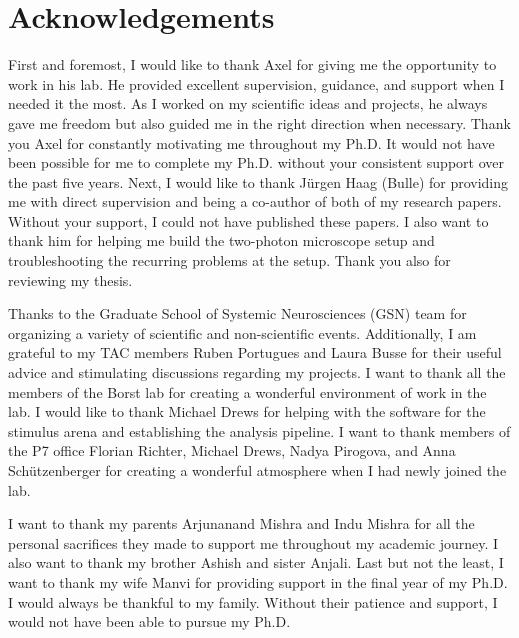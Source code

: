 
\begingroup
\let\clearpage\relax
\let\cleardoublepage\relax
\let\cleardoublepage\relax

\chapter*{Acknowledgements}

First and foremost, I would like to thank Axel for giving me the opportunity to work in his lab. He provided excellent supervision, guidance, and support when I needed it the most. As I worked on my scientific ideas and projects, he always gave me freedom but also guided me in the right direction when necessary. Thank you Axel for constantly motivating me throughout my Ph.D. It would not have been possible for me to complete my Ph.D. without your consistent support over the past five years. Next, I would like to thank Jürgen Haag (Bulle) for providing me with direct supervision and being a co-author of both of my research papers. Without your support, I could not have published these papers. I also want to thank him for helping me build the two-photon microscope setup and troubleshooting the recurring problems at the setup. Thank you also for reviewing my thesis. 

Thanks to the Graduate School of Systemic Neurosciences (GSN) team for organizing a variety of scientific and non-scientific events. Additionally, I am grateful to my TAC members Ruben Portugues and Laura Busse for their useful advice and stimulating discussions regarding my projects. I want to thank all the members of the Borst lab for creating a wonderful environment of work in the lab. I would like to thank Michael Drews for helping with the software for the stimulus arena and establishing the analysis pipeline. I want to thank members of the P7 office Florian Richter, Michael Drews, Nadya Pirogova, and Anna Schützenberger for creating a wonderful atmosphere when I had newly joined the lab. 

I want to thank my parents Arjunanand Mishra and Indu Mishra for all the personal sacrifices they made to support me throughout my academic journey. I also want to thank my brother Ashish and sister Anjali. Last but not the least, I want to thank my wife Manvi for providing support in the final year of my Ph.D. I would always be thankful to my family. Without their patience and support, I would not have been able to pursue my Ph.D.


